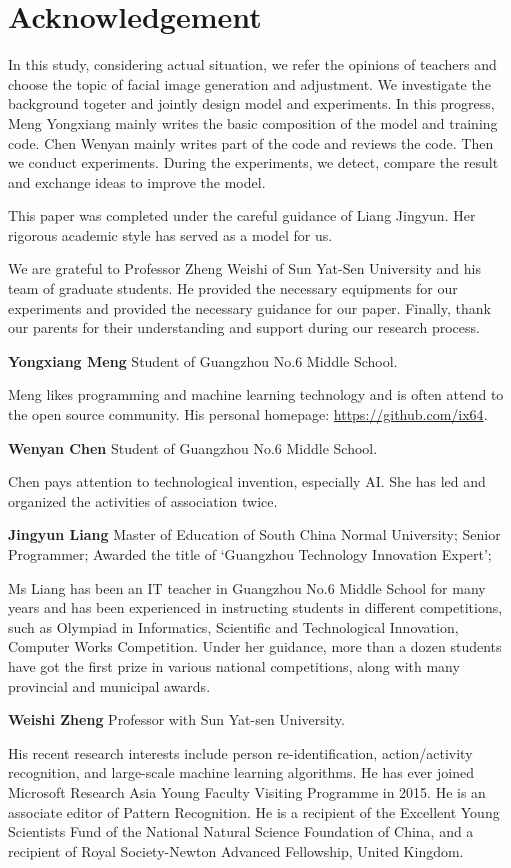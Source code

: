 \section*{Acknowledgement}

In this study, considering actual situation,
    we refer the opinions of teachers and choose the topic of facial image generation and adjustment.
We investigate the background togeter and jointly design model and experiments.
In this progress, Meng Yongxiang mainly writes the basic composition of the model and training code.
Chen Wenyan mainly writes part of the code and reviews the code.
Then we conduct experiments.
During the experiments, we detect, compare the result and exchange ideas to improve the model.

This paper was completed under the careful guidance of Liang Jingyun.
Her rigorous academic style has served as a model for us.

We are grateful to Professor Zheng Weishi of Sun Yat-Sen University and his team of graduate students.
He provided the necessary equipments for our experiments and provided the necessary guidance for our paper.
Finally, thank our parents for their understanding and support during our research process.

\vspace{4ex}


\textbf{Yongxiang Meng}  Student of Guangzhou No.6 Middle School.

Meng likes programming and machine learning technology and is often attend to the open source community.
His personal homepage: \url{https://github.com/ix64}.


\textbf{Wenyan Chen}  Student of Guangzhou No.6 Middle School.

Chen pays attention to technological invention, especially AI.
She has led and organized the activities of association twice.

\textbf{Jingyun Liang}  Master of Education of South China Normal University;
Senior Programmer;
Awarded the title of ‘Guangzhou Technology Innovation Expert’;

Ms Liang has been an IT teacher in Guangzhou No.6 Middle School for many years and has been experienced in instructing students in different competitions,
    such as Olympiad in Informatics,
    Scientific and Technological Innovation, Computer Works Competition.
Under her guidance, more than a dozen students have got the first prize in various national competitions,
    along with many provincial and municipal awards.


\textbf{Weishi Zheng}  Professor with Sun Yat-sen University.

His recent research interests include person re-identification, action/activity recognition, and large-scale machine learning algorithms.
He has ever joined Microsoft Research Asia Young Faculty Visiting Programme in 2015.
He is an associate editor of Pattern Recognition.
He is a recipient of the Excellent Young Scientists Fund of the National Natural Science Foundation of China,
    and a recipient of Royal Society-Newton Advanced Fellowship, United Kingdom.

